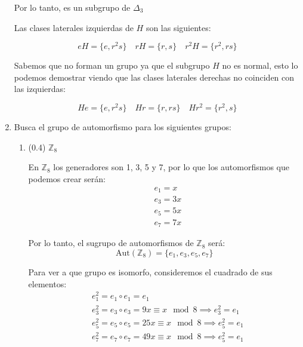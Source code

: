 \documentclass[a4paper,12pt]{article}
\begin{document}
\begin{enumerate}
    Por lo tanto, es un subgrupo de $\Delta_3$

    Las clases laterales izquierdas de $H$ son las siguientes:

    $$
    eH = \{e, r^2s\} \quad rH = \{r, s\} \quad r^2H = \{r^2, rs\}
    $$

    Sabemos que no forman un grupo ya que el subgrupo $H$ no es normal, esto lo podemos demostrar viendo que las clases laterales derechas no coinciden con las izquierdas:

    $$
    He = \{e, r^2s\} \quad Hr = \{r, rs\} \quad Hr^2= \{r^2, s\}
    $$

    \pagebreak

    \item Busca el grupo de automorfismo para los siguientes grupos:

    \begin{enumerate}
        \item (0.4) $\mathbb{Z}_8$

        En $\mathbb{Z}_8$ los generadores son 1, 3, 5 y 7, por lo que los automorfismos que podemos crear serán:
        \begin{equation*}
            \begin{split}
                & e_{1} = x\\
                & e_{3} = 3x\\
                & e_{5} = 5x\\
                & e_{7} = 7x
            \end{split}
        \end{equation*}

        Por lo tanto, el sugrupo de automorfismos de $\mathbb{Z}_8$ será:
        $$\text{Aut}(\mathbb{Z}_8) = \{e_{1},e_{3},e_{5},e_{7}\}$$

        Para ver a que grupo es isomorfo, consideremos el cuadrado de sus elementos:
         \begin{equation*}
            \begin{split}
                & e_{1}^2 = e_{1} \circ e_{1} = e_{1}\\
                & e_{3}^2 = e_{3} \circ e_{3} = 9x \equiv x \mod 8 \implies e_{3}^2 = e_{1}\\
                & e_{5}^2 = e_{5} \circ e_{5} = 25x \equiv x \mod 8 \implies e_{5}^2 = e_{1}\\
                & e_{7}^2 = e_{7} \circ e_{7} = 49x \equiv x \mod 8 \implies e_{5}^2 = e_{1}
            \end{split}
        \end{equation*}


\end{enumerate}
\end{enumerate}
\end{document}

